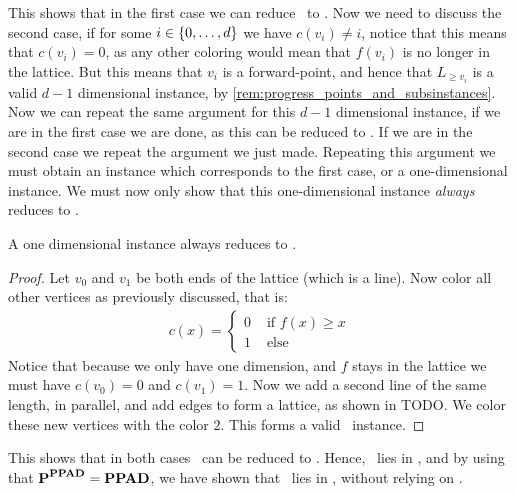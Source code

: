 This shows that in the first case we can reduce \Tarskistar\ to \Sperner. Now we need to discuss the second case, if for some $i \in \left\{0, \dots, d\right\}$ we have $c(v_i) \neq i$, notice that this means that $c(v_i) = 0$, as any other coloring would mean that $f(v_i)$ is no longer in the lattice. But this means that $v_i$ is a forward-point, and hence that $L_{\geq v_i}$ is a valid $d-1$ dimensional \Tarskistar instance, by \cref{rem:progress_points_and_subsinstances}. Now we can repeat the same argument for this $d-1$ dimensional \Tarskistar instance, if we are in the first case we are done, as this can be reduced to \Sperner. If we are in the second case we repeat the argument we just made. Repeating this argument we must obtain an \Tarskistar instance which corresponds to the first case, or a one-dimensional \Tarskistar instance. We must now only show that this one-dimensional instance \emph{always} reduces to \Sperner.

\begin{claim}
    A one dimensional \Tarskistar instance always reduces to \Sperner.
\end{claim}
\begin{proof}
    Let $v_0$ and $v_1$ be both ends of the lattice (which is a line). Now color all other vertices as previously discussed, that is:
    \begin{align*}
        c(x) =  \begin{cases}
            0 &\text{ if $f(x) \geq x$} \\
            1 &\text{ else}
        \end{cases}
    \end{align*}
    Notice that because we only have one dimension, and $f$ stays in the lattice we must have $c(v_0) = 0$ and $c(v_1) = 1$. Now we add a second line of the same length, in parallel, and add edges to form a lattice, as shown in TODO. We color these new vertices with the color $2$. This forms a valid \Sperner\ instance.
\end{proof}

This shows that in both cases \Tarskistar\ can be reduced to \Sperner. Hence, \Tarskistar\ lies in \PPAD, and by using that $\textbf{P}^{\textbf{PPAD}} = \textbf{PPAD}$, we have shown that \Tarski\ lies in \PPAD, without relying on \Brouwer.